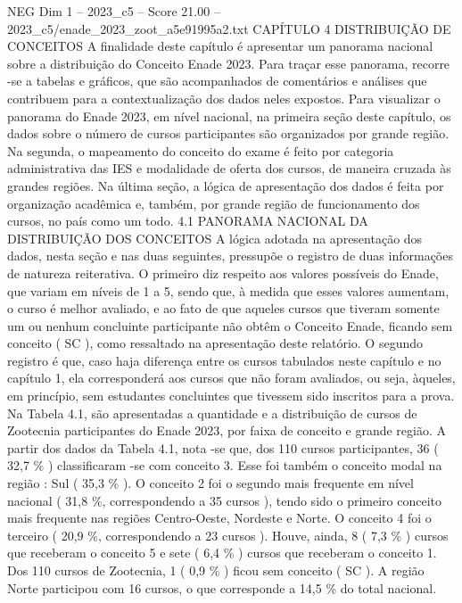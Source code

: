 \begin{textsample}{NEG Dim 1 – 2023\_c5 – Score 21.00 – 2023\_c5/enade\_2023\_zoot\_a5e91995a2.txt}  \label{ex:f1_neg_428}
CAPÍTULO 4 DISTRIBUIÇÃO DE CONCEITOS A finalidade deste capítulo é apresentar um panorama nacional sobre a distribuição do Conceito Enade 2023.
Para traçar esse panorama, recorre -se a tabelas e gráficos, que são acompanhados de comentários e análises que contribuem para a contextualização dos dados neles expostos.
Para visualizar o panorama do Enade 2023, em nível nacional, na primeira seção deste capítulo, os dados sobre o número de cursos participantes são organizados por grande região.
Na segunda, o mapeamento do conceito do exame é feito por categoria administrativa das IES e modalidade de oferta dos cursos, de maneira cruzada às grandes regiões.
Na última seção, a lógica de apresentação dos dados é feita por organização acadêmica e, também, por grande região de funcionamento dos cursos, no país como um todo. 4.1 PANORAMA NACIONAL DA DISTRIBUIÇÃO DOS CONCEITOS A lógica adotada na apresentação dos dados, nesta seção e nas duas seguintes, pressupõe o registro de duas informações de natureza reiterativa.
O primeiro diz respeito aos valores possíveis do Enade, que variam em níveis de 1 a 5, sendo que, à medida que esses valores aumentam, o curso é melhor avaliado, e ao fato de que aqueles cursos que tiveram somente um ou nenhum concluinte participante não obtêm o Conceito Enade, ficando sem conceito ( SC ), como ressaltado na apresentação deste relatório.
O segundo registro é que, caso haja diferença entre os cursos tabulados neste capítulo e no capítulo 1, ela corresponderá aos cursos que não foram avaliados, ou seja, àqueles, em princípio, sem estudantes concluintes que tivessem sido inscritos para a prova.
Na Tabela 4.1, são apresentadas a quantidade e a distribuição de cursos de Zootecnia participantes do Enade 2023, por faixa de conceito e grande região.
A partir dos dados da Tabela 4.1, nota -se que, dos 110 cursos participantes, 36 ( 32,7 \% ) classificaram -se com conceito 3.
Esse foi também o conceito modal na região : Sul ( 35,3 \% ).
O conceito 2 foi o segundo mais frequente em nível nacional ( 31,8 \%, correspondendo a 35 cursos ), tendo sido o primeiro conceito mais frequente nas regiões Centro-Oeste, Nordeste e Norte.
O conceito 4 foi o terceiro ( 20,9 \%, correspondendo a 23 cursos ).
Houve, ainda, 8 ( 7,3 \% ) cursos que receberam o conceito 5 e sete ( 6,4 \% ) cursos que receberam o conceito 1.
Dos 110 cursos de Zootecnia, 1 ( 0,9 \% ) ficou sem conceito ( SC ).
A região Norte participou com 16 cursos, o que corresponde a 14,5 \% do total nacional.

\end{textsample}
